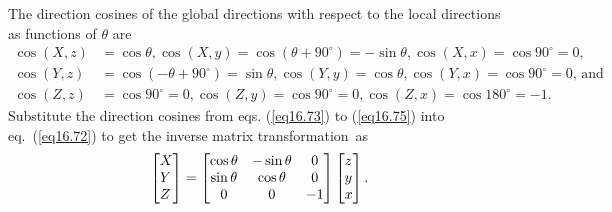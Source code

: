 \documentclass{AeroStructure-ERJohnson}
\begin{document}
The direction cosines of the global directions with respect to the local directions as functions of $\theta$ are
\begin{align}
\cos (X, z)&=\cos \theta, \cos (X, y)=\cos \left(\theta+90^{\circ}\right)=-\sin \theta, \cos (X, x)=\cos 90^{\circ}=0,\label{eq16.73}\\
\cos (Y, z)&=\cos \left(-\theta+90^{\circ}\right)=\sin \theta, \cos (Y, y)=\cos \theta, \cos (Y, x)=\cos 90^{\circ}=0\mbox{, and}\label{eq16.74}\\
\cos (Z, z)&=\cos 90^{\circ}=0, \cos (Z, y)=\cos 90^{\circ}=0, \cos (Z, x)=\cos 180^{\circ}=-1.\label{eq16.75}
\end{align}
Substitute the direction cosines from eqs. (\ref{eq16.73}) to (\ref{eq16.75}) into eq.~(\ref{eq16.72}) to get the inverse matrix transformation~as
\begin{align}\label{eq16.76}
\left[\begin{array}{@{}l@{}}X \\Y \\Z\end{array}\right]=\left[\begin{array}{@{}ccc@{}}\cos \theta & -\sin \theta & 0 \\\sin \theta & \cos \theta & 0 \\0 & 0 & -1\end{array}\right]\left[\begin{array}{@{}l@{}}z \\y \\x\end{array}\right].
\end{align}
\end{document}
